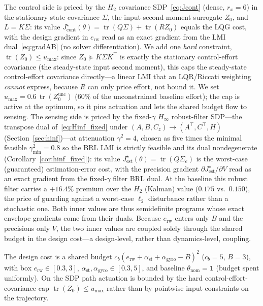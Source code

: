 \documentclass[twocolumn,amsthm]{autart}
\begin{document}
The control side is priced by the $H_2$ covariance SDP~\eqref{eq:Jcont} (dense,
$r_x=6$) in the stationary state covariance $\Sigma$, the input-second-moment
surrogate $Z_0$, and $L=K\Sigma$: its value
$J_{\mathrm{cont}}^\star(\theta)=\operatorname{tr}(Q\Sigma)+\operatorname{tr}(RZ_0)$
equals the LQG cost, with the design gradient in $e_{\mathrm{rw}}$ read as an exact
gradient from the LMI dual~\eqref{eq:gradAB} (no solver differentiation). We add one
\emph{hard} constraint, $\operatorname{tr}(Z_0)\le u_{\max}$: since
$Z_0\succeq K\Sigma K^\top$ is exactly the stationary control-effort covariance (the
steady-state input second moment), this caps the steady-state control-effort
covariance directly---a linear LMI that an LQR/Riccati weighting \emph{cannot}
express, because $R$ can only price effort, not bound it. We set
$u_{\max}=0.6\,\operatorname{tr}(Z_0^{\mathrm{unc}})$ (60\% of the unconstrained
baseline effort); the cap is active at the optimum, so it pins actuation and lets the
shared budget flow to sensing. The sensing side is priced by the fixed-$\gamma$
$H_\infty$ robust-filter SDP---the transpose dual of~\eqref{eq:Hinf_fixed} under
$(A,B,C_z)\!\to\!(A^\top,C^\top,H)$ (Section~\ref{sec:hinf})---at attenuation
$\gamma^2=4$, chosen as five times the minimal feasible $\gamma^2_{\min}=0.8$ so the
BRL LMI is strictly feasible and its dual nondegenerate
(Corollary~\ref{cor:hinf_fixed}): its value
$J_{\mathrm{est}}^\star(\theta)=\operatorname{tr}(Q\Sigma_e)$ is the worst-case
(guaranteed) estimation-error cost, with the precision gradient
$\partial J_{\mathrm{est}}^\star/\partial V$ read as an exact gradient from the
fixed-$\gamma$ filter BRL dual. At the baseline this robust filter carries a
$+16.4\%$ premium over the $H_2$ (Kalman) value ($0.175$ vs.\ $0.150$), the price of
guarding against a worst-case $\ell_2$ disturbance rather than a stochastic one. Both
inner values are thus semidefinite programs whose exact envelope gradients come from
their duals.
Because $e_{\mathrm{rw}}$ enters only $B$ and the precisions only $V$, the two inner
values are coupled solely through the shared budget in the design cost---a
design-level, rather than dynamics-level, coupling.

The design cost is a shared budget $c_b(e_{\mathrm{rw}}+\alpha_{\mathrm{st}}+
\alpha_{\mathrm{gyro}}-B)^2$ ($c_b=5$, $B=3$), with box
$e_{\mathrm{rw}}\in[0.3,3]$, $\alpha_{\mathrm{st}},\alpha_{\mathrm{gyro}}\in[0.3,5]$,
and baseline $\theta_{\mathrm{nom}}=\mathbf 1$ (budget spent uniformly). On the SDP
path actuation is bounded by the hard control-effort-covariance cap
$\operatorname{tr}(Z_0)\le u_{\max}$ rather than by pointwise input constraints on
the trajectory.
\end{document}
